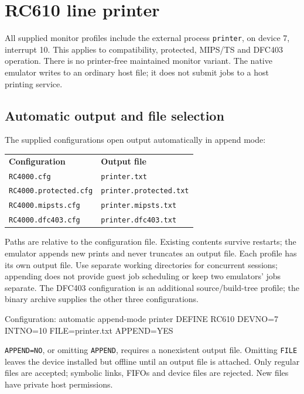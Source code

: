 \chapter{RC610 line printer}\label{rc610-line-printer}

All supplied monitor profiles include the external process \texttt{printer},
on device 7, interrupt 10. This applies to compatibility, protected, MIPS/TS
and DFC403 operation. There is no printer-free maintained monitor variant.
The native emulator writes to an ordinary host file; it does not submit jobs
to a host printing service.

\section{Automatic output and file selection}

The supplied configurations open output automatically in append mode:

\begin{center}
\begin{tabular}{ll}
\textbf{Configuration} & \textbf{Output file} \\
\texttt{RC4000.cfg} & \texttt{printer.txt} \\
\texttt{RC4000.protected.cfg} & \texttt{printer.protected.txt} \\
\texttt{RC4000.mipsts.cfg} & \texttt{printer.mipsts.txt} \\
\texttt{RC4000.dfc403.cfg} & \texttt{printer.dfc403.txt} \\
\end{tabular}
\end{center}

Paths are relative to the configuration file. Existing contents survive
restarts; the emulator appends new prints and never truncates an output file.
Each profile has its own output file. Use separate working directories for
concurrent sessions; appending does not provide guest job scheduling or keep
two emulators' jobs separate.
The DFC403 configuration is an additional source/build-tree profile; the
binary archive supplies the other three configurations.

\begin{commandexample}{Configuration: automatic append-mode printer}
DEFINE RC610 DEVNO=7 INTNO=10 FILE=printer.txt APPEND=YES
\end{commandexample}

\texttt{APPEND=NO}, or omitting \texttt{APPEND}, requires a nonexistent output
file. Omitting \texttt{FILE} leaves the device installed but offline until an
output file is attached. Only regular files are accepted; symbolic links,
FIFOs and device files are rejected. New files have private host permissions.


